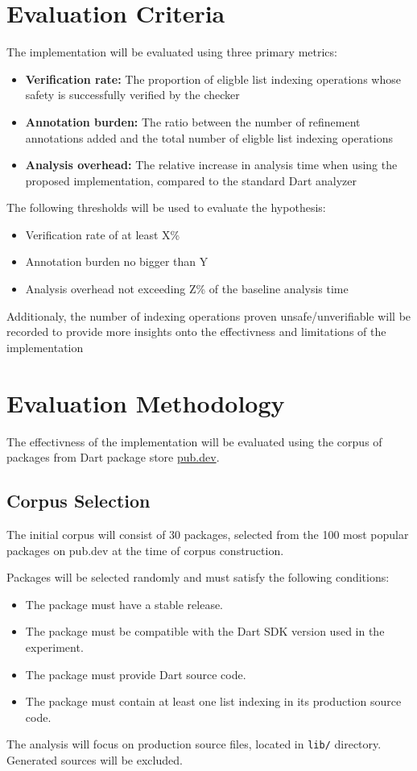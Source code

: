 \section{Evaluation Criteria}
\label{sec:evaluation_critera}
The implementation will be evaluated using three primary metrics:
\begin{itemize}
    \item \textbf{Verification rate:} The proportion of eligble list indexing operations
    whose safety is successfully verified by the checker
    \item \textbf{Annotation burden:} The ratio between the number of refinement annotations
    added and the total number of eligble list indexing operations
    \item \textbf{Analysis overhead:} The relative increase in analysis time when using
    the proposed implementation, compared to the standard Dart analyzer
\end{itemize}
The following thresholds will be used to evaluate the hypothesis:
\begin{itemize}
    \item Verification rate of at least X\%
    \item Annotation burden no bigger than Y
    \item Analysis overhead not exceeding Z\% of the baseline analysis time
\end{itemize}

Additionaly, the number of indexing operations proven unsafe/unverifiable will be recorded
to provide more insights onto the effectivness and limitations of the implementation

\section{Evaluation Methodology}
\label{sec:evaluation_methodology}
The effectivness of the implementation will be evaluated using the corpus of packages 
from Dart package store \href{pub.dev}{pub.dev}.

\subsection{Corpus Selection}
The initial corpus will consist of 30 packages, selected from the 100 most popular packages
on pub.dev at the time of corpus construction.

Packages will be selected randomly and must satisfy the following conditions:
\begin{itemize}
    \item The package must have a stable release.
    \item The package must be compatible with the Dart SDK version used in the experiment.
    \item The package must provide Dart source code.
    \item The package must contain at least one list indexing in its production source code. 
\end{itemize}
The analysis will focus on production source files, located in \texttt{lib/} directory.
Generated sources will be excluded.

